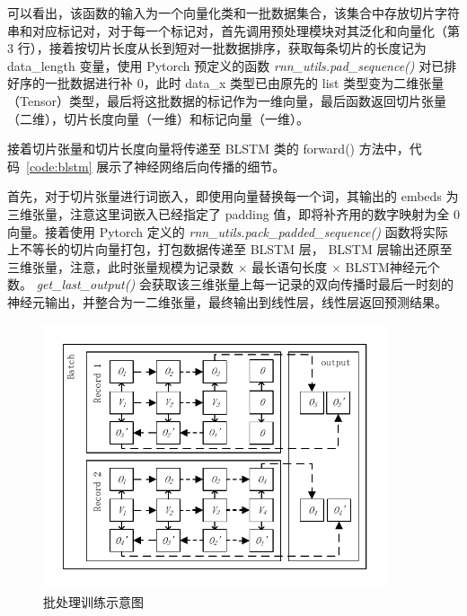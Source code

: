 \begin{minipage}[!htbp]{0.9\textwidth}
    
\end{minipage}

可以看出，该函数的输入为一个向量化类和一批数据集合，该集合中存放切片字符串和对应标记对，对于每一个标记对，首先调用预处理模块对其泛化和向量化（第 3 行），接着按切片长度从长到短对一批数据排序，获取每条切片的长度记为 data\_length 变量，使用 Pytorch 预定义的函数 \textit{rnn\_utils.pad\_sequence()} 对已排好序的一批数据进行补 0，此时 data\_x 类型已由原先的 list 类型变为二维张量（Tensor）类型，最后将这批数据的标记作为一维向量，最后函数返回切片张量（二维），切片长度向量（一维）和标记向量（一维）。

接着切片张量和切片长度向量将传递至 BLSTM 类的 forward() 方法中，代码~\ref{code:blstm} 展示了神经网络后向传播的细节。

\begin{minipage}[!htbp]{0.9\textwidth}
    
\end{minipage}

首先，对于切片张量进行词嵌入，即使用向量替换每一个词，其输出的 embeds 为三维张量，注意这里词嵌入已经指定了 padding 值，即将补齐用的数字映射为全 0 向量。接着使用 Pytorch 定义的 \textit{rnn\_utils.pack\_padded\_sequence()} 函数将实际上不等长的切片向量打包，打包数据传递至 BLSTM 层， BLSTM 层输出还原至三维张量，注意，此时张量规模为记录数 $\times$ 最长语句长度 $\times$ BLSTM神经元个数。 \textit{get\_last\_output()} 会获取该三维张量上每一记录的双向传播时最后一时刻的神经元输出，并整合为一二维张量，最终输出到线性层，线性层返回预测结果。

\begin{figure}[!htb]
    \centering
    \includegraphics[width=0.9\textwidth]{FIGs/chapter4/blstmFoward.pdf}
    \caption{批处理训练示意图}\label{blstmForward}
\end{figure}

